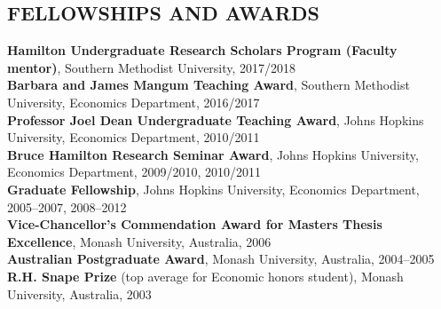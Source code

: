 \documentclass[11pt]{res}
\begin{document}
\begin{resume}
\section{FELLOWSHIPS AND AWARDS}\vspace{2mm}
{\bf Hamilton Undergraduate Research Scholars Program (Faculty mentor)}, Southern Methodist University, 2017/2018\vspace{1.5mm}\\
{\bf Barbara and James Mangum Teaching Award}, Southern Methodist University, Economics Department, 2016/2017\vspace{1.5mm}\\
{\bf Professor Joel Dean Undergraduate Teaching Award}, Johns Hopkins University, Economics Department, 2010/2011\vspace{1.5mm}\\
{\bf Bruce Hamilton Research Seminar Award}, Johns Hopkins University, Economics Department, 2009/2010, 2010/2011\vspace{1.5mm}\\
{\bf Graduate Fellowship}, Johns Hopkins University, Economics Department, 2005--2007, 2008--2012\vspace{1.5mm}\\
{\bf Vice-Chancellor's Commendation Award for Masters Thesis Excellence}, Monash University, Australia, 2006\vspace{1.5mm}\\
{\bf Australian Postgraduate Award}, Monash University, Australia, 2004--2005\vspace{1.5mm}\\
{\bf R.H. Snape Prize} (top average for Economic honors student), Monash University, Australia, 2003
\end{resume}
\end{document}
